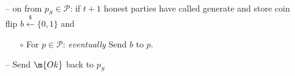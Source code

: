 \begin{minipage}{0.5\textwidth}
\begin{bbox}[title={Functionality $\F_\m{flip}(\mathcal{P})$}]
~
\begin{itemize}[leftmargin=*]
\item[--] on  from $p_S \in \mathcal{P}$: if $t+1$ honest parties have called  generate and store coin flip $b \xleftarrow{\$} \{0,1\}$ and 

\begin{itemize}
\item[$\circ$] For $p \in \mathcal{P}$: \emph{eventually} Send $b$ to $p$.
\end{itemize}

\item[--] Send $\m{Ok}$ back to $p_S$



\end{itemize}
\end{bbox}
\end{minipage}

